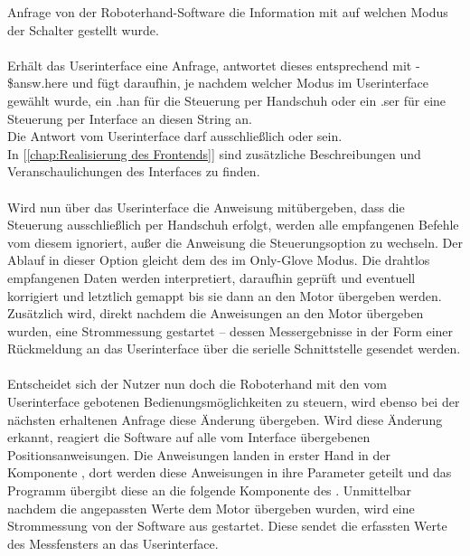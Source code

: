 \documentclass[titlepage,12pt,twoside]{article}
\begin{document}
Anfrage von der Roboterhand-Software die Information mit auf welchen Modus der Schalter gestellt wurde. \\
\\
Erhält das Userinterface eine Anfrage, antwortet dieses entsprechend mit - \$answ.here und fügt daraufhin, je nachdem welcher Modus im Userinterface gewählt 
wurde, ein .han für die Steuerung per Handschuh oder ein .ser für eine Steuerung per Interface an diesen String an. \\
Die Antwort vom Userinterface darf ausschließlich  oder  sein. \\
In [\textcolor{blue}{\autoref{chap:Realisierung des Frontends}}] sind zusätzliche Beschreibungen und Veranschaulichungen des Interfaces zu finden. \\
\\
Wird nun über das Userinterface die Anweisung mitübergeben, dass die Steuerung ausschließlich per Handschuh erfolgt, werden alle empfangenen Befehle vom 
diesem ignoriert, außer die Anweisung die Steuerungsoption zu wechseln. Der Ablauf in dieser Option gleicht dem des im Only-Glove Modus. Die drahtlos 
empfangenen Daten werden interpretiert, daraufhin geprüft und eventuell korrigiert und letztlich gemappt bis sie dann an den Motor übergeben werden. 
Zusätzlich wird, direkt nachdem die Anweisungen an den Motor übergeben wurden, eine Strommessung gestartet – dessen Messergebnisse in der Form einer 
Rückmeldung an das Userinterface über die serielle Schnittstelle gesendet werden. \\
\\
Entscheidet sich der Nutzer nun doch die Roboterhand mit den vom Userinterface gebotenen Bedienungsmöglichkeiten zu steuern, wird ebenso bei der nächsten 
erhaltenen Anfrage diese Änderung übergeben. Wird diese Änderung erkannt, reagiert die Software auf alle vom Interface übergebenen Positionsanweisungen. 
Die Anweisungen landen in erster Hand in der Komponente , dort werden diese Anweisungen in ihre Parameter geteilt und das Programm übergibt 
diese an die folgende Komponente des . Unmittelbar nachdem die angepassten Werte dem Motor übergeben wurden, wird eine Strommessung von 
der Software aus gestartet. Diese sendet die erfassten Werte des Messfensters an das Userinterface. \\
\\
\end{document}
